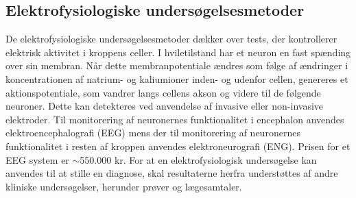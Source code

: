 \subsection{Elektrofysiologiske undersøgelsesmetoder}
De elektrofysiologiske undersøgelsesmetoder dækker over tests, der kontrollerer elektrisk aktivitet i kroppens celler. I hviletilstand har et neuron en fast spænding over sin membran. Når dette membranpotentiale ændres som følge af ændringer i koncentrationen af natrium- og kaliumioner inden- og udenfor cellen, genereres et aktionspotentiale, som vandrer langs cellens akson og videre til de følgende neuroner. Dette kan detekteres ved anvendelse af invasive eller non-invasive elektroder. Til monitorering af neuronernes funktionalitet i encephalon anvendes elektroencephalografi (EEG) mens der til monitorering af neuronernes funktionalitet i resten af kroppen anvendes elektroneurografi (ENG). Prisen for et EEG system er $\sim$550.000 kr. \citep{Biosemi2016} For at en elektrofysiologisk undersøgelse kan anvendes til at stille en diagnose, skal resultaterne herfra understøttes af andre kliniske undersøgelser, herunder prøver og lægesamtaler. \citep{Robinson2008} 

